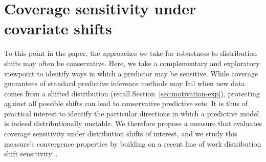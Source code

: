 
\newcommand{\predsetthresh}{t}
\newcommand{\infdiv}[2]{D_{\infty}\left({#1} |\!| {#2}\right)}
\newcommand{\Aug}{\textrm{A}}
\newcommand{\nBatch}{B}
\newcommand{\batch}{b}
\newcommand{\qfunc}{\mc{Q}}

\newcommand{\Pcovset}{\mc{P}_{\textup{cov},I}}

\section{Coverage sensitivity under covariate shifts}
\label{sec:sensitivity}

To this point in the paper, the approaches we take for robustness to
distribution shifts may often be conservative. Here, we take a complementary
and exploratory viewpoint to identify ways in which a predictor may be
sensitive. While coverage guarantees of standard predictive inference
methods may fail when new data comes from a shifted distribution (recall
Section~\ref{sec:motivation-exp}), protecting against all possible shifts
can lead to conservative predictive sets.  It is thus of practical interest
to identify the particular directions in which a predictive model is indeed
distributionally unstable.  We therefore propose a measure that evaluates
coverage sensitivity under distribution shifts of interest, and we study
this measure's convergence properties by building on a recent line of work
distribution shift sensitivity~\citep{JeongNa20, SubbaswamyAdSa21,
  GuptaRo21}.

%

